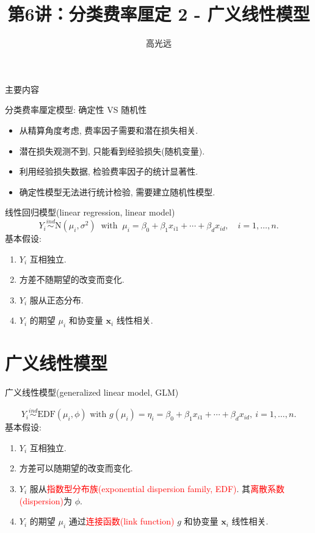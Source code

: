 \documentclass[professionalfont]{beamer}
\title{第6讲：分类费率厘定 2 - 广义线性模型}
\author{高光远}
\institute{中国人民大学~统计学院}
\date{}
\def\bx{\boldsymbol{x}}
\newcommand{\red}[1]{\textcolor{red}{#1}}
\begin{document}
\begin{frame}
	\titlepage
\end{frame}

\begin{frame}{主要内容}
	\tableofcontents
\end{frame}




\begin{frame}{分类费率厘定模型: 确定性 VS 随机性}
\begin{itemize}
\item 从精算角度考虑, 费率因子需要和潜在损失相关.
\item 潜在损失观测不到, 只能看到经验损失(随机变量).
\item 利用经验损失数据, 检验费率因子的统计显著性.
\item 确定性模型无法进行统计检验, 需要建立随机性模型.	
\end{itemize}
\end{frame}
\begin{frame}{线性回归模型(linear regression, linear model)}
	$$Y_i\overset{ind}{\sim}\text{N}(\mu_i, \sigma^2)~\text{ with }~\mu_i=\beta_0+\beta_1x_{i1}+\cdots+\beta_dx_{id},\quad i=1,\ldots,n.$$ 
	基本假设:
	\begin{enumerate}
		\item $Y_i$ 互相独立.
		\item 方差不随期望的改变而变化.
		\item $Y_i$ 服从正态分布.
		\item $Y_i$ 的期望 $\mu_i$ 和协变量 $\bx_i$ 线性相关.
	\end{enumerate}
\end{frame}
\section{广义线性模型}
\begin{frame}{广义线性模型(generalized linear model, GLM)}
	
	$$Y_i\overset{ind}{\sim}\text{EDF}(\mu_i, \phi)\text{ with }g(\mu_i)=\eta_i=\beta_0+\beta_1x_{i1}+\cdots+\beta_dx_{id}, ~ i=1,\ldots,n.$$ 
	基本假设:
	\begin{enumerate}
		\item $Y_i$ 互相独立.
		\item 方差可以随期望的改变而变化.
		\item $Y_i$ 服从\red{指数型分布族(exponential dispersion family, EDF)}. 其\red{离散系数(dispersion)}为 $\phi$.
		\item $Y_i$ 的期望 $\mu_i$ 通过\red{连接函数(link function)} $g$ 和协变量 $\bx_i$ 线性相关.
	\end{enumerate}
\end{frame}
\end{document}
